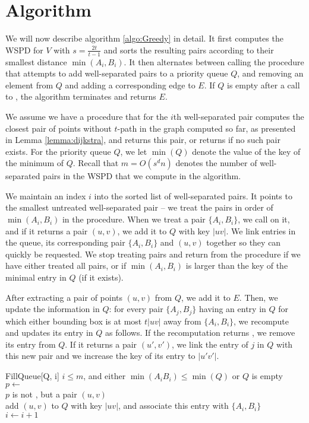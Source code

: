\documentclass[runningheads,envcountsame,oribibl,orivec]{llncs}
\begin{document}
\section{Algorithm} \label{section:algorithm}

We will now describe algorithm \ref{algo:Greedy} in detail. It first computes the WSPD for $V$ with $s = \frac{2t}{t-1}$ and sorts the resulting pairs according to their smallest distance $\min(A_i, B_i)$. It then alternates between calling the  procedure that attempts to add well-separated pairs to a priority queue $Q$, and removing an element from $Q$ and adding a corresponding edge to $E$. If $Q$ is empty after a call to , the algorithm terminates and returns $E$.

We assume we have a procedure  that for the $i$th well-separated pair computes the closest pair of points without $t$-path in the graph computed so far, as presented in Lemma \ref{lemma:dijkstra}, and returns this pair, or returns \qnil if no such pair exists. For the priority queue $Q$, we let $\min(Q)$ denote the value of the key of the minimum of $Q$. Recall that $m = O(s^d n)$ denotes the number of well-separated pairs in the WSPD that we compute in the algorithm.

We maintain an index $i$ into the sorted list of well-separated pairs. It points to the smallest untreated well-separated pair -- we treat the pairs in order of $\min(A_i, B_i)$ in the  procedure. When we treat a pair $\{ A_i, B_i \}$, we call  on it, and if it returns a pair $(u, v)$, we add it to $Q$ with key $|uv|$. We link entries in the queue, its corresponding pair $\{ A_i, B_i \}$ and $(u, v)$ together so they can quickly be requested. We stop treating pairs and return from the procedure if we have either treated all pairs, or if $\min(A_i, B_i)$ is larger than the key of the minimal entry in $Q$ (if it exists).

After extracting a pair of points $(u, v)$ from $Q$, we add it to $E$. Then, we update the information in $Q$: for every pair $\{ A_j, B_j \}$ having an entry in $Q$ for which either bounding box is at most $t|uv|$ away from $\{ A_i, B_i \}$, we recompute  and updates its entry in $Q$ as follows. If the recomputation returns \qnil, we remove its entry from $Q$. If it returns a pair $(u', v')$, we link the entry of $j$ in $Q$ with this new pair and we increase the key of its entry to $|u'v'|$.

\begin{algorithm}{FillQueue}[Q, i]{}
  \qwhile \label{algo:guard} $i \leq m$, and either $\min(A_i B_i) \leq \min(Q)$ or $Q$ is empty
  \\ \qdo $p \gets $ 
       \\ \qif $p$ is not \qnil, but a pair $(u, v)$
       \\ \qthen add $(u, v)$ to $Q$ with key $|uv|$, and associate this entry with $\{ A_i, B_i \}$
          \qendif
       \\ $i \gets i + 1$
  \qend
\end{algorithm}
\end{document}
